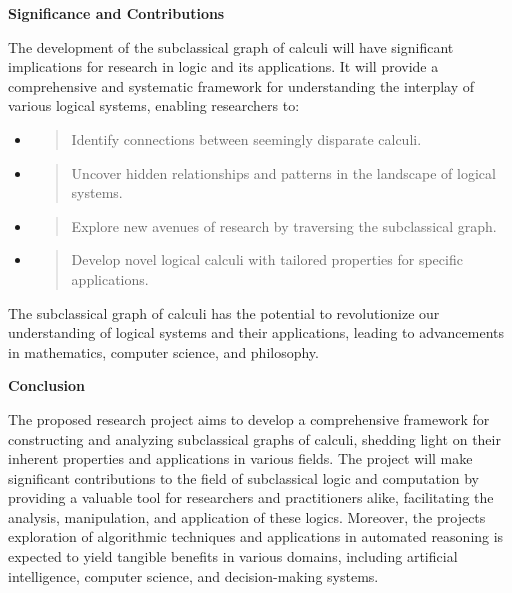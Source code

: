 \textbf{Significance and Contributions}

The development of the subclassical graph of calculi will have
significant implications for research in logic and its applications. It
will provide a comprehensive and systematic framework for understanding
the interplay of various logical systems, enabling researchers to:

\begin{itemize}
\item
  \begin{quote}
  Identify connections between seemingly disparate calculi.
  \end{quote}
\item
  \begin{quote}
  Uncover hidden relationships and patterns in the landscape of logical
  systems.
  \end{quote}
\item
  \begin{quote}
  Explore new avenues of research by traversing the subclassical graph.
  \end{quote}
\item
  \begin{quote}
  Develop novel logical calculi with tailored properties for specific
  applications.
  \end{quote}
\end{itemize}

The subclassical graph of calculi has the potential to revolutionize our
understanding of logical systems and their applications, leading to
advancements in mathematics, computer science, and philosophy.

\textbf{Conclusion}

The proposed research project aims to develop a comprehensive framework
for constructing and analyzing subclassical graphs of calculi, shedding
light on their inherent properties and applications in various fields.
The project will make significant contributions to the field of
subclassical logic and computation by providing a valuable tool for
researchers and practitioners alike, facilitating the analysis,
manipulation, and application of these logics. Moreover, the
project\textquotesingle s exploration of algorithmic techniques and
applications in automated reasoning is expected to yield tangible
benefits in various domains, including artificial intelligence, computer
science, and decision-making systems.

\hypertarget{section}{%
\section{}\label{section}}

